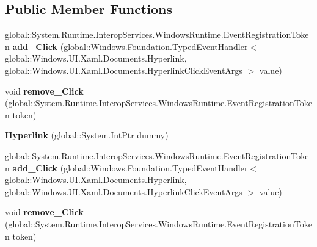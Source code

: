 \subsection*{Public Member Functions}
\begin{DoxyCompactItemize}
\item 
\mbox{\label{class_windows_1_1_u_i_1_1_xaml_1_1_documents_1_1_hyperlink_affeaa11b3385e3c202507e52f89e8e9c}} 
global\+::\+System.\+Runtime.\+Interop\+Services.\+Windows\+Runtime.\+Event\+Registration\+Token {\bfseries add\+\_\+\+Click} (global\+::\+Windows.\+Foundation.\+Typed\+Event\+Handler$<$ global\+::\+Windows.\+U\+I.\+Xaml.\+Documents.\+Hyperlink, global\+::\+Windows.\+U\+I.\+Xaml.\+Documents.\+Hyperlink\+Click\+Event\+Args $>$ value)
\item 
\mbox{\label{class_windows_1_1_u_i_1_1_xaml_1_1_documents_1_1_hyperlink_af58bad7f30cb13f3d129ef81adcd34cb}} 
void {\bfseries remove\+\_\+\+Click} (global\+::\+System.\+Runtime.\+Interop\+Services.\+Windows\+Runtime.\+Event\+Registration\+Token token)
\item 
\mbox{\label{class_windows_1_1_u_i_1_1_xaml_1_1_documents_1_1_hyperlink_a08712572a1cb4eedfbd6f7cd2c4acc27}} 
{\bfseries Hyperlink} (global\+::\+System.\+Int\+Ptr dummy)
\item 
\mbox{\label{class_windows_1_1_u_i_1_1_xaml_1_1_documents_1_1_hyperlink_affeaa11b3385e3c202507e52f89e8e9c}} 
global\+::\+System.\+Runtime.\+Interop\+Services.\+Windows\+Runtime.\+Event\+Registration\+Token {\bfseries add\+\_\+\+Click} (global\+::\+Windows.\+Foundation.\+Typed\+Event\+Handler$<$ global\+::\+Windows.\+U\+I.\+Xaml.\+Documents.\+Hyperlink, global\+::\+Windows.\+U\+I.\+Xaml.\+Documents.\+Hyperlink\+Click\+Event\+Args $>$ value)
\item 
\mbox{\label{class_windows_1_1_u_i_1_1_xaml_1_1_documents_1_1_hyperlink_af58bad7f30cb13f3d129ef81adcd34cb}} 
void {\bfseries remove\+\_\+\+Click} (global\+::\+System.\+Runtime.\+Interop\+Services.\+Windows\+Runtime.\+Event\+Registration\+Token token)
\item 

\end{DoxyCompactItemize}

